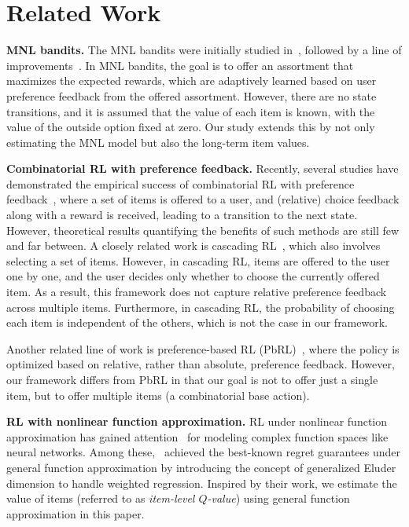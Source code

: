 \section{Related Work}
\label{sec:Related}
%
\textbf{MNL bandits.}
%
The MNL bandits were initially studied in~\citet{rusmevichientong2010dynamic}, followed by a line of improvements~\citep{filippi2010parametric, rusmevichientong2010dynamic, agrawal2017thompson, oh2019thompson, faury2020improved, abeille2021instance, faury2022jointly, oh2021multinomial, perivier2022dynamic, agrawal2023tractable, lee2024nearly}.
In MNL bandits, the goal is to offer an assortment that maximizes the expected rewards, which are adaptively learned based on user preference feedback from the offered assortment.
However, there are no state transitions, and it is assumed that the value of each item is known, with the value of the outside option fixed at zero.
Our study extends this by not only estimating the MNL model but also the long-term item values.

%
\textbf{Combinatorial RL with preference feedback.}
%
Recently, several studies have demonstrated the empirical success of combinatorial RL with preference feedback~\citep{swaminathan2017off, ie2019slateq, mcinerney2020counterfactual, vlassis2021control, chaudhari2024distributional}, where a set of items is offered to a user, and (relative) choice feedback along with a reward is received, leading to a transition to the next state.
However, theoretical results quantifying the benefits of such methods are still few and far between.
A closely related work is cascading RL~\citep{du2024cascading}, which also involves selecting a set of items. 
However, in cascading RL, items are offered to the user one by one, and the user decides only whether to choose the currently offered item. 
As a result, this framework does not capture relative preference feedback across multiple items. 
Furthermore, in cascading RL, the probability of choosing each item is independent of the others, which is not the case in our framework.


Another related line of work is preference-based RL (PbRL)~\citep{akrour2012april, wirth2017survey, christiano2017deep, ouyang2022training, saha2023dueling, zhu2023principled, zhan2023provable}, where the policy is optimized based on relative, rather than absolute, preference feedback. 
However, our framework differs from PbRL in that our goal is not to offer just a single item, but to offer multiple items (a combinatorial base action).


%
\textbf{RL with nonlinear function approximation.}
RL under nonlinear function approximation has gained attention~\citep{jiang2017contextual, wang2020reinforcement_eluder, jin2021bellman, du2021bilinear, foster2021statistical, agarwal2023vo, zhao2023nearly} for modeling complex function spaces like neural networks.
Among these,~\citet{agarwal2023vo, zhao2023nearly} achieved the best-known regret guarantees under general function approximation by introducing the concept of generalized Eluder dimension to handle weighted regression. 
Inspired by their work, we estimate the value of items (referred to as \textit{item-level $Q$-value}) using general function approximation in this paper.

